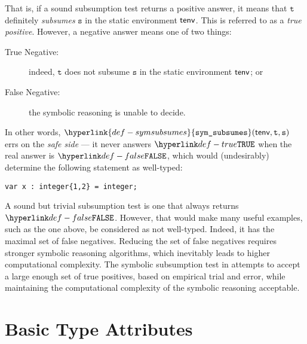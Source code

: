 \documentclass{book}
\newcommand\symsubsumes[0]{\hyperlink{def-symsubsumes}{\texttt{sym\_subsumes}}}
\newcommand\vt[0]{\texttt{t}}
\newcommand\vs[0]{\texttt{s}}
\begin{document}
That is, if a sound subsumption test returns a positive answer, it means that
$\vt$ definitely \emph{subsumes} $\vs$ in the static environment $\textsf{tenv}$.
This is referred to as a \emph{true positive}.
However, a negative answer means one of two things:
\begin{description}
  \item[True Negative:] indeed, $\vt$ does not subsume $\vs$ in the static environment $\textsf{tenv}$; or
  \item[False Negative:] the symbolic reasoning is unable to decide.
\end{description}

In other words, $\symsubsumes(\tenv, \vt, \vs)$ errs on the \emph{safe side} ---
it never answers $\True$ when the real answer is $\False$, which would (undesirably)
determine the following statement as well-typed:
\begin{center}
  \verb|var x : integer{1,2} = integer;|
\end{center}

A sound but trivial subsumption test is one that always returns $\False$.
However, that would make many useful examples, such as the one above,
be considered as not well-typed. Indeed, it has the maximal set of false negatives.
Reducing the set of false negatives requires stronger symbolic reasoning algorithms,
which inevitably leads to higher computational complexity.
%
The symbolic subsumption test in 
attempts to accept a large enough set of true positives, based on empirical trial and error,
while maintaining the computational complexity of the symbolic reasoning acceptable.

\chapter{Basic Type Attributes}
\end{document}
